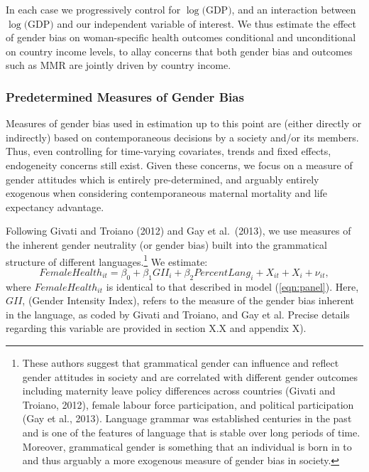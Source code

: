 \documentclass[11pt]{article}
\begin{document}
\begin{spacing}{1.4}
In each case we progressively control for $\log($GDP$)$, and an interaction 
between $\log($GDP$)$ and our independent variable of interest.  We thus 
estimate the effect of gender bias on woman-specific health outcomes conditional 
and unconditional on country income levels, to allay concerns that both gender 
bias and outcomes such as MMR are jointly driven by country income.

\subsubsection{Predetermined Measures of Gender Bias}
\label{ssscn:language}
Measures of gender bias used in estimation up to this point are (either directly 
or indirectly) based on contemporaneous decisions by a society and/or its 
members.  Thus, even controlling for time-varying covariates, trends and fixed 
effects, endogeneity concerns still exist.  Given these concerns, we focus on a 
measure of gender attitudes which is entirely pre-determined, and arguably 
entirely exogenous when considering contemporaneous maternal mortality and life 
expectancy advantage.

Following Givati and Troiano (2012) and Gay et al.\ (2013), we use measures of
the inherent gender neutrality (or gender bias) built into the grammatical 
structure of different languages.\footnote{These authors suggest that grammatical 
gender can influence and reflect gender attitudes in society and are correlated 
with different gender outcomes including maternity leave policy differences 
across countries (Givati and Troiano, 2012), female labour force participation, 
and political 
participation (Gay et al., 2013). Language grammar was established centuries in 
the past and is one of the features of language that is stable over long periods 
of time. Moreover, grammatical gender is something that an individual is born 
in to and thus arguably a more exogenous measure of gender bias in society.}  We 
estimate:
\begin{equation}
\label{eqn:gii}
FemaleHealth_{it} = \beta_0 + \beta_1 GII_i + \beta_2 PercentLang_i + X_{it} + X_i 
                  + \nu_{it},
\end{equation}
where $FemaleHealth_{it}$ is identical to that described in model 
(\ref{eqn:panel}). Here, $GII$, (Gender Intensity Index), refers to the measure 
of the gender bias inherent in the language, as coded by Givati and Troiano, and 
Gay et al.  Precise details regarding this variable are provided in section X.X 
and appendix X).


\end{spacing}
\end{document}
